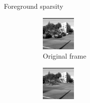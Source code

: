 \documentclass{beamer}
\begin{document}
                  \begin{frame}{Foreground sparsity}
                                      
                 
\begin{figure}[h]
  \centering
   \begin{subfigure}[b]{0.3\textwidth}
                \centering
                \includegraphics[width=\textwidth]{testFrameSp}
                \caption{Original frame}
        \end{subfigure}
\quad
\begin{subfigure}[b]{0.3\textwidth}
                \centering
                \includegraphics[width=\textwidth]{bgSp}

\end{subfigure}
\end{figure}
\end{frame}
\end{document}
